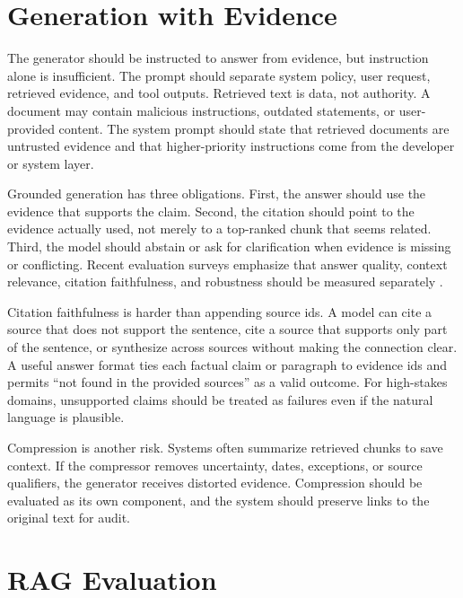 \section{Generation with Evidence}
\label{sec:generation-with-evidence}

The generator should be instructed to answer from evidence, but instruction alone is insufficient. The prompt should separate system policy, user request, retrieved evidence, and tool outputs. Retrieved text is data, not authority. A document may contain malicious instructions, outdated statements, or user-provided content. The system prompt should state that retrieved documents are untrusted evidence and that higher-priority instructions come from the developer or system layer.

Grounded generation has three obligations. First, the answer should use the evidence that supports the claim. Second, the citation should point to the evidence actually used, not merely to a top-ranked chunk that seems related. Third, the model should abstain or ask for clarification when evidence is missing or conflicting. Recent \rag evaluation surveys emphasize that answer quality, context relevance, citation faithfulness, and robustness should be measured separately \cite{gan2025rag}.

Citation faithfulness is harder than appending source ids. A model can cite a source that does not support the sentence, cite a source that supports only part of the sentence, or synthesize across sources without making the connection clear. A useful answer format ties each factual claim or paragraph to evidence ids and permits ``not found in the provided sources'' as a valid outcome. For high-stakes domains, unsupported claims should be treated as failures even if the natural language is plausible.

Compression is another risk. Systems often summarize retrieved chunks to save context. If the compressor removes uncertainty, dates, exceptions, or source qualifiers, the generator receives distorted evidence. Compression should be evaluated as its own component, and the system should preserve links to the original text for audit.

\section{RAG Evaluation}
\label{sec:rag-evaluation}

